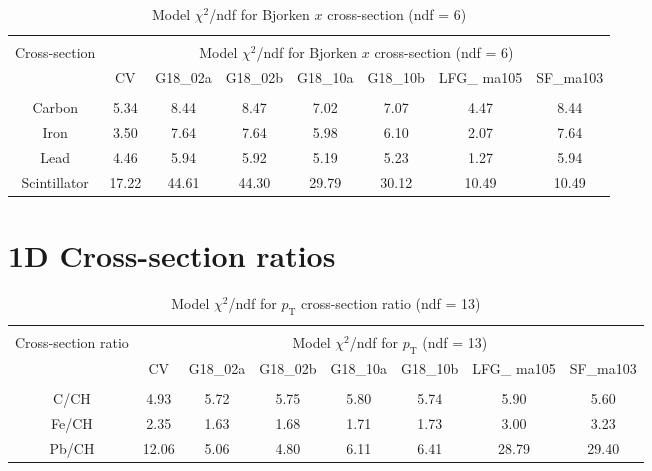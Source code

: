 \begin{table}[h]
    \centering
    \begin{adjustbox}{width=1.01\textwidth,center=\textwidth}
    \begin{tabular}{c  c c c c c c c}
    \hline \\ [-1.5 ex]
    \multirow[c]{2}{*}{Cross-section} & \multicolumn{7}{c}{Model $\chi^2$/ndf for Bjorken $x$ cross-section (ndf = 6) } \\ [0.8ex]
    & CV & G18\_02a & G18\_02b & G18\_10a & G18\_10b & LFG\_ ma105 & SF\_ma103\\ [0.5ex] %
    \hline
    \hline \\[-1.9ex]
    Carbon & 5.34 & 8.44 & 8.47 & 7.02 & 7.07 & 4.47 & 8.44\\
    Iron & 3.50 & 7.64 & 7.64 & 5.98 & 6.10 & 2.07 & 7.64 \\
    Lead & 4.46 & 5.94 & 5.92 & 5.19 & 5.23 & 1.27 & 5.94 \\
    Scintillator & 17.22 & 44.61 & 44.30 & 29.79 & 30.12 & 10.49 & 10.49 \\
    \hline
    \end{tabular}
    \end{adjustbox}
    \caption{Model $\chi^2$/ndf for Bjorken $x$ cross-section (ndf = 6)}
    \label{table:xsec_modelComparison_x}
\end{table}


\newpage
\section{1D Cross-section ratios}

\begin{table}[h]
    \centering
    \begin{adjustbox}{width=1.01\textwidth,center=\textwidth}
    \begin{tabular}{c c c c c c c c}
    \hline \\ [-1.5 ex]
    \multirow[c]{2}{*}{Cross-section ratio} & \multicolumn{7}{c}{Model $\chi^2$/ndf for $p_{\text{T}}$ (ndf = 13) } \\ [0.8ex]
     & CV & G18\_02a & G18\_02b & G18\_10a & G18\_10b & LFG\_ ma105 & SF\_ma103\\ [0.5ex] %
    \hline
    \hline \\[-1.9ex]
    C/CH & 4.93 & 5.72 & 5.75 & 5.80 & 5.74 & 5.90 & 5.60 \\
    Fe/CH & 2.35 & 1.63 & 1.68 & 1.71 & 1.73 & 3.00 & 3.23 \\
    Pb/CH & 12.06 & 5.06 & 4.80 & 6.11 & 6.41 & 28.79 & 29.40 \\
    \hline
    \end{tabular}    
    \end{adjustbox}
    \caption{Model $\chi^2$/ndf for $p_{\text{T}}$ cross-section ratio (ndf = 13)}
    \label{table:xsecRatio_modelComparison_pT}
\end{table}

